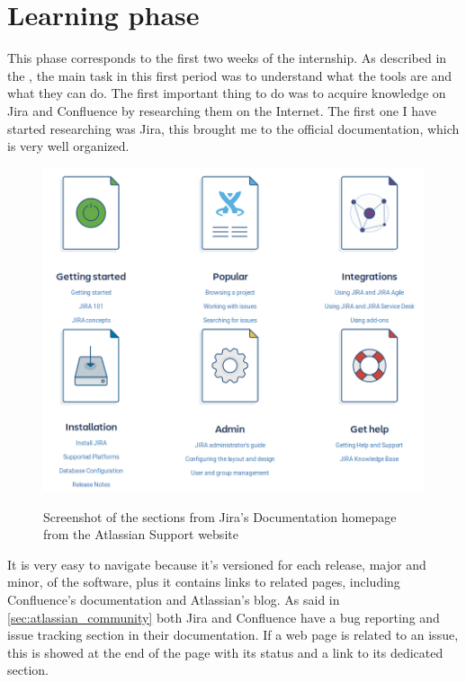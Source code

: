 \section{Learning phase}
	This phase corresponds to the first two weeks of the internship.
	As described in the , the main task in this first period  was to understand what the tools are and what they can do.
	The first important thing to do was to acquire knowledge on Jira and Confluence by researching them on the Internet.
	The first one I have started researching was Jira, this brought me to the official documentation\cite{jira_docu}, which is very well organized.
	\begin{figure}[H]
		\centering
		\includegraphics[width=1\textwidth]{resources/jira_documentation}\\
		\caption[Screenshot from Jira's Documentation page]{Screenshot of the sections from Jira's Documentation homepage from the Atlassian Support website}
	\end{figure}
	It is very easy to navigate because it's versioned for each release, major and minor, of the software, plus it contains links to related pages, including Confluence's documentation and Atlassian's blog.
	As said in \ref{sec:atlassian_community} both Jira and Confluence have a bug reporting and issue tracking section in their documentation.
	If a web page is related to an issue, this is showed at the end of the page with its status and a link to its dedicated section.\\
